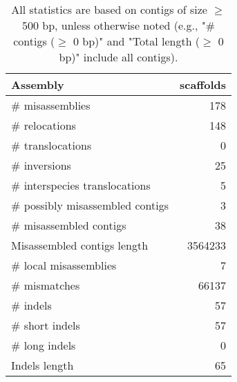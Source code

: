 \documentclass[12pt,a4paper]{article}
\begin{document}
\begin{table}[ht]
\begin{center}
\caption{All statistics are based on contigs of size $\geq$ 500 bp, unless otherwise noted (e.g., "\# contigs ($\geq$ 0 bp)" and "Total length ($\geq$ 0 bp)" include all contigs).}
\begin{tabular}{|l*{1}{|r}|}
\hline
Assembly & scaffolds \\ \hline
\# misassemblies & 178 \\ \hline
\hspace{5mm}\# relocations & 148 \\ \hline
\hspace{5mm}\# translocations & 0 \\ \hline
\hspace{5mm}\# inversions & 25 \\ \hline
\hspace{5mm}\# interspecies translocations & 5 \\ \hline
\# possibly misassembled contigs & 3 \\ \hline
\# misassembled contigs & 38 \\ \hline
Misassembled contigs length & 3564233 \\ \hline
\# local misassemblies & 7 \\ \hline
\# mismatches & 66137 \\ \hline
\# indels & 57 \\ \hline
\hspace{5mm}\# short indels & 57 \\ \hline
\hspace{5mm}\# long indels & 0 \\ \hline
Indels length & 65 \\ \hline
\end{tabular}
\end{center}
\end{table}
\end{document}
